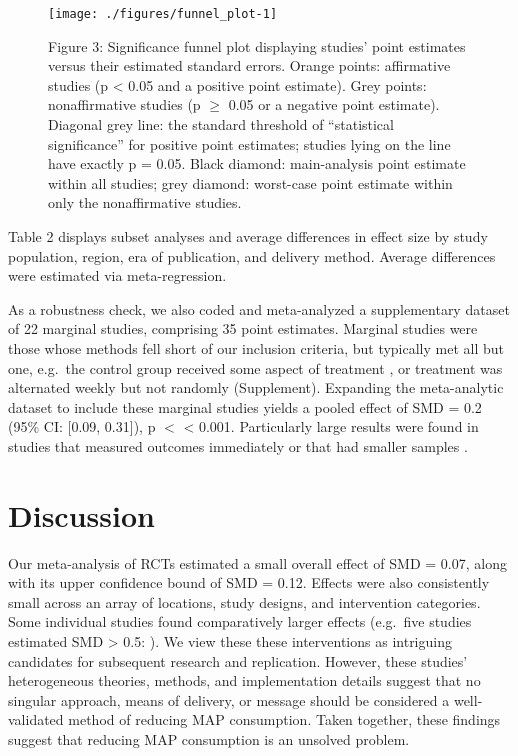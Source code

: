 \documentclass[preprint, 3p,
authoryear]{elsarticle} %
\begin{document}
\begin{figure}[H]

{\centering \texttt{[image: ./figures/funnel\_plot-1]} 

}

\caption{Figure 3: Significance funnel plot displaying studies’ point estimates versus their estimated standard errors. Orange points: affirmative studies (p < 0.05 and a positive point estimate). Grey points: nonaffirmative studies (p $\geq$ 0.05 or a negative point estimate). Diagonal grey line: the standard threshold of “statistical significance” for positive point estimates; studies lying on the line have exactly p = 0.05. Black diamond: main-analysis point estimate within all studies; grey diamond: worst-case point estimate within only the nonaffirmative studies.}\label{fig:funnel_plot}
\end{figure}

Table 2 displays subset analyses and average differences in effect size
by study population, region, era of publication, and delivery method.
Average differences were estimated via meta-regression.

As a robustness check, we also coded and meta-analyzed a supplementary
dataset of 22 marginal studies, comprising 35 point estimates. Marginal
studies were those whose methods fell short of our inclusion criteria,
but typically met all but one, e.g.~the control group received some
aspect of treatment \citep{piazza2022}, or treatment was alternated
weekly but not randomly \citep{garnett2020} (Supplement). Expanding the
meta-analytic dataset to include these marginal studies yields a pooled
effect of SMD = 0.2 (95\% CI: {[}0.09, 0.31{]}), p \(<\) \textless{}
0.001. Particularly large results were found in studies that measured
outcomes immediately \citep{hansen2021} or that had smaller samples
\citep{lentz2020}.

\section{Discussion}\label{Sec4}

Our meta-analysis of RCTs estimated a small overall effect of SMD =
0.07, along with its upper confidence bound of SMD = 0.12. Effects were
also consistently small across an array of locations, study designs, and
intervention categories. Some individual studies found comparatively
larger effects (e.g.~five studies estimated SMD \textgreater{} 0.5:
\citep{carfora2023, merrill2009, kanchanachitra2020, bianchi2022, piester2020}).
We view these these interventions as intriguing candidates for
subsequent research and replication. However, these studies'
heterogeneous theories, methods, and implementation details suggest that
no singular approach, means of delivery, or message should be considered
a well-validated method of reducing MAP consumption. Taken together,
these findings suggest that reducing MAP consumption is an unsolved
problem.
\end{document}
